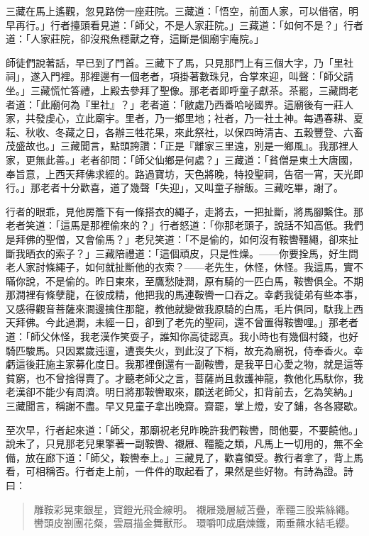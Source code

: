 三藏在馬上遙觀，忽見路傍一座莊院。三藏道：「悟空，前面人家，可以借宿，明早再行。」行者擡頭看見道：「師父，不是人家莊院。」三藏道：「如何不是？」行者道：「人家莊院，卻沒飛魚穩獸之脊，這斷是個廟宇庵院。」

師徒們說著話，早已到了門首。三藏下了馬，只見那門上有三個大字，乃「里社祠」，遂入門裡。那裡邊有一個老者，項掛著數珠兒，合掌來迎，叫聲：「師父請坐。」三藏慌忙答禮，上殿去參拜了聖像。那老者即呼童子獻茶。茶罷，三藏問老者道：「此廟何為『里社』？」老者道：「敝處乃西番哈咇國界。這廟後有一莊人家，共發虔心，立此廟宇。里者，乃一鄉里地；社者，乃一社土神。每遇春耕、夏耘、秋收、冬藏之日，各辦三牲花果，來此祭社，以保四時清吉、五穀豐登、六畜茂盛故也。」三藏聞言，點頭誇讚：「正是『離家三里遠，別是一鄉風』。我那裡人家，更無此善。」老者卻問：「師父仙鄉是何處？」三藏道：「貧僧是東土大唐國，奉旨意，上西天拜佛求經的。路過寶坊，天色將晚，特投聖祠，告宿一宵，天光即行。」那老者十分歡喜，道了幾聲「失迎」，又叫童子辦飯。三藏吃畢，謝了。

行者的眼乖，見他房簷下有一條搭衣的繩子，走將去，一把扯斷，將馬腳繫住。那老者笑道：「這馬是那裡偷來的？」行者怒道：「你那老頭子，說話不知高低。我們是拜佛的聖僧，又會偷馬？」老兒笑道：「不是偷的，如何沒有鞍轡韁繩，卻來扯斷我晒衣的索子？」三藏陪禮道：「這個頑皮，只是性燥。——你要拴馬，好生問老人家討條繩子，如何就扯斷他的衣索？——老先生，休怪，休怪。我這馬，實不瞞你說，不是偷的。昨日東來，至鷹愁陡澗，原有騎的一匹白馬，鞍轡俱全。不期那澗裡有條孽龍，在彼成精，他把我的馬連鞍轡一口吞之。幸虧我徒弟有些本事，又感得觀音菩薩來澗邊擒住那龍，教他就變做我原騎的白馬，毛片俱同，馱我上西天拜佛。今此過澗，未經一日，卻到了老先的聖祠，還不曾置得鞍轡哩。」那老者道：「師父休怪，我老漢作笑耍子，誰知你高徒認真。我小時也有幾個村錢，也好騎匹駿馬。只因累歲迍邅，遭喪失火，到此沒了下梢，故充為廟祝，侍奉香火。幸虧這後莊施主家募化度日。我那裡倒還有一副鞍轡，是我平日心愛之物，就是這等貧窮，也不曾捨得賣了。才聽老師父之言，菩薩尚且救護神龍，教他化馬馱你，我老漢卻不能少有周濟。明日將那鞍轡取來，願送老師父，扣背前去，乞為笑納。」三藏聞言，稱謝不盡。早又見童子拿出晚齋。齋罷，掌上燈，安了鋪，各各寢歇。

至次早，行者起來道：「師父，那廟祝老兒昨晚許我們鞍轡，問他要，不要饒他。」說未了，只見那老兒果擎著一副鞍轡、襯屜、韁籠之類，凡馬上一切用的，無不全備，放在廊下道：「師父，鞍轡奉上。」三藏見了，歡喜領受。教行者拿了，背上馬看，可相稱否。行者走上前，一件件的取起看了，果然是些好物。有詩為證。詩曰：
\begin{quote}
雕鞍彩晃柬銀星，寶鐙光飛金線明。
襯屜幾層絨苫疊，牽韁三股紫絲繩。
轡頭皮劄團花粲，雲扇描金舞獸形。
環嚼叩成磨煉鐵，兩垂蘸水結毛纓。
\end{quote}

